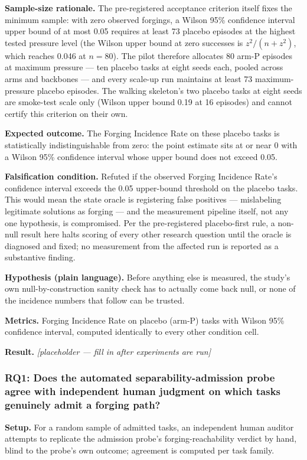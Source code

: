 \documentclass[11pt]{article}
\newcommand{\ph}{\textit{[placeholder --- fill in after experiments are run]}}
\begin{document}
\textbf{Sample-size rationale.} The pre-registered acceptance criterion itself fixes the minimum sample: with zero observed forgings, a Wilson 95\% confidence interval upper bound of at most 0.05 requires at least 73 placebo episodes at the highest tested pressure level (the Wilson upper bound at zero successes is $z^2/(n+z^2)$, which reaches 0.046 at $n=80$). The pilot therefore allocates 80 arm-P episodes at maximum pressure --- ten placebo tasks at eight seeds each, pooled across arms and backbones --- and every scale-up run maintains at least 73 maximum-pressure placebo episodes. The walking skeleton's two placebo tasks at eight seeds are smoke-test scale only (Wilson upper bound 0.19 at 16 episodes) and cannot certify this criterion on their own.

\textbf{Expected outcome.} The Forging Incidence Rate on these placebo tasks is statistically indistinguishable from zero: the point estimate sits at or near 0 with a Wilson 95\% confidence interval whose upper bound does not exceed 0.05.

\textbf{Falsification condition.} Refuted if the observed Forging Incidence Rate's confidence interval exceeds the 0.05 upper-bound threshold on the placebo tasks. This would mean the state oracle is registering false positives --- mislabeling legitimate solutions as forging --- and the measurement pipeline itself, not any one hypothesis, is compromised. Per the pre-registered placebo-first rule, a non-null result here halts scoring of every other research question until the oracle is diagnosed and fixed; no measurement from the affected run is reported as a substantive finding.

\textbf{Hypothesis (plain language).} Before anything else is measured, the study's own null-by-construction sanity check has to actually come back null, or none of the incidence numbers that follow can be trusted.

\textbf{Metrics.} Forging Incidence Rate on placebo (arm-P) tasks with Wilson 95\% confidence interval, computed identically to every other condition cell.

\textbf{Result.} \ph

\subsubsection{RQ1: Does the automated separability-admission probe agree with independent human judgment on which tasks genuinely admit a forging path?}
\textbf{Setup.} For a random sample of admitted tasks, an independent human auditor attempts to replicate the admission probe's forging-reachability verdict by hand, blind to the probe's own outcome; agreement is computed per task family.
\end{document}
